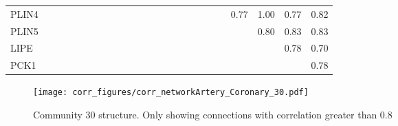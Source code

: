 \begin{longtable}{lrrrrrrrrrrrrrrrrrrrrrrr}
PLIN4   &               &             &              &           &               &              &            &             &            &              &            &               &             &             &            &             &             &             &             &        0.77 &       1.00 &       0.77 &         0.82 \\
PLIN5   &               &             &              &           &               &              &            &             &            &              &            &               &             &             &            &             &             &             &             &             &       0.80 &       0.83 &         0.83 \\
LIPE    &               &             &              &           &               &              &            &             &            &              &            &               &             &             &            &             &             &             &             &             &            &       0.78 &         0.70 \\
PCK1    &               &             &              &           &               &              &            &             &            &              &            &               &             &             &            &             &             &             &             &             &            &            &         0.78 \\
\end{longtable}


\begin{figure}[h!]
\centering
\texttt{[image: corr\_figures/corr\_networkArtery\_Coronary\_30.pdf]}
\caption{Community 30 structure. Only showing connections with correlation greater than 0.8}
\end{figure}


